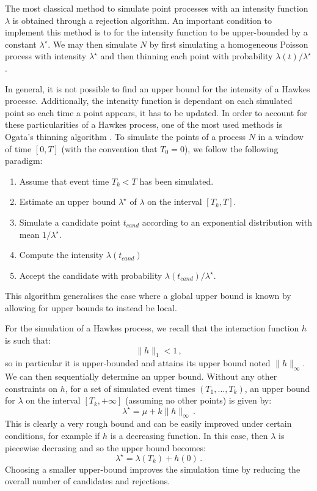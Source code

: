 The most classical method to simulate point processes with an intensity function $\lambda$ is obtained through a rejection algorithm. An important condition to implement this method is to for the intensity function to be upper-bounded by a constant $\lambda^\star$.
We may then simulate $N$ by first simulating a homogeneous Poisson process with intensity $\lambda^\star$ and then thinning each point with probability $\lambda(t) / \lambda^\star$.

In general, it is not possible to find an upper bound for the intensity of a Hawkes processe. Additionally, the intensity function is dependant on each simulated point so each time a point appears, it has to be updated. In order to account for these particularities of a Hawkes process, one of the most used methods is Ogata's thinning algorithm \parencite{Ogata1981}.
To simulate the points of a process $N$ in a window of time $[0,T]$ (with the convention that $T_0 = 0$), we follow the following paradigm:

\begin{enumerate}
\item Assume that event time $T_k < T$ has been simulated.
\item Estimate an upper bound $\lambda^\star$ of $\lambda$ on the interval $[T_k, T]$.
\item Simulate a candidate point $t_{cand}$ according to an exponential distribution with mean $1 / \lambda^\star$.
\item Compute the intensity $\lambda(t_{cand})$
\item Accept the candidate with probability $\lambda(t_{cand}) / \lambda^\star$.
\end{enumerate}
This algorithm generalises the case where a global upper bound is known by allowing for upper bounds to instead be local.

For the simulation of a Hawkes process, we recall that the interaction function $h$ is such that:
\[\|h\|_1 < 1\,,\]
so in particular it is upper-bounded and attains its upper bound noted $\|h\|_{\infty}$. We can then sequentially determine an upper bound. Without any other constraints on $h$, for a set of simulated event times $(T_1, \ldots, T_k)$, an upper bound for $\lambda$ on the interval $[T_k, +\infty]$ (assuming no other points) is given by:
\[\lambda^\star = \mu + k\|h\|_{\infty}\,.\]
This is clearly a very rough bound and can be easily improved under certain conditions, for example if $h$ is a decreasing function. In this case, then $\lambda$ is piecewise decrasing and so the upper bound becomes:
\[\lambda^\star = \lambda(T_k) + h(0)\,.\]
Choosing a smaller upper-bound improves the simulation time by reducing the overall number of candidates and rejections.

